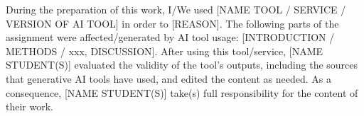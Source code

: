 \documentclass{article}
\begin{document}
During the preparation of this work, I/We used [NAME TOOL / SERVICE / VERSION OF AI TOOL] in order to [REASON]. The following parts of the assignment were affected/generated by AI tool usage: [INTRODUCTION / METHODS / xxx, DISCUSSION]. After using this tool/service, [NAME STUDENT(S)] evaluated the validity of the tool's outputs, including the sources that generative AI tools have used, and edited the content as needed. As a consequence, [NAME STUDENT(S)] take(s) full responsibility for the content of their work.



\end{document}
